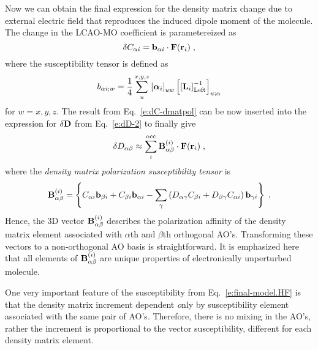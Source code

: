 \documentclass[aip,graphicx]{revtex4-1}
\newcommand{\BM}[1]{\bm{#1}}
\begin{document}
Now we can obtain the final expression for the density matrix change 
due to external electric field that reproduces the 
induced dipole moment of the molecule.
The change in the LCAO\hyp{}MO coefficient is parametereized as
%
\begin{equation} \label{e:dC-dmatpol}
 \delta C_{\alpha i} = {\bf b}_{\alpha i} \cdot {\bf F}({\bf r}_i)  \;,
\end{equation}
%
where the susceptibility tensor is defined as
%
\begin{equation} \label{e:susceptibility-b}
  b_{\alpha i;w} = \frac{1}{4} \sum_u^{x, y, z} \left[ {\BM{\alpha}}_i \right]_{uw}
   \left[ \left[ {\bf L}_i  \right]^{-1}_{\rm Left} \right]_{u;\alpha}  
\end{equation}
%
for $w=x,y,z$. The result from Eq.~\eqref{e:dC-dmatpol} can be now inserted into 
the expression for $\delta {\bf D}$ from Eq.~\eqref{e:dD-2} to finally give
%
\begin{equation}\label{e:final-model.HF}
 \delta D_{\alpha\beta} \approx \sum_i^{\rm occ} {\bf B}^{(i)}_{\alpha\beta} \cdot {\bf F}({\bf r}_i)  \;,
\end{equation}
%
where the \emph{density matrix polarization susceptibility tensor} is
%
\begin{equation}  \label{e:susceptibility-B}
 {\bf B}^{(i)}_{\alpha\beta} = \left\{
%
                               C_{\alpha i} {\bf b}_{\beta i} + C_{\beta i} {\bf b}_{\alpha i}
                               - \sum_\gamma 
                                 \left( 
               D_{\alpha\gamma} C_{\beta i} + D_{\beta\gamma} C_{\alpha i}
                                 \right)
                                           {\bf b}_{\gamma i}
%
\right\}  \;.
\end{equation}
%
Hence, the 3D vector ${\bf B}^{(i)}_{\alpha\beta}$ describes the polarization affinity
of the density matrix element associated with $\alpha$th and $\beta$th orthogonal AO's.
Transforming these vectors to a non\hyp{}orthogonal AO basis is straightforward.
It is emphasized here that all elements of ${\bf B}_{\alpha\beta}^{(i)}$
are unique properties of electronically unperturbed molecule. 

One very important feature of the susceptibility from Eq.~\eqref{e:final-model.HF} is that
the density matrix increment dependent {\emph only} by susceptibility element associated with the same
pair of AO's. Therefore, there is no mixing in the AO's, rather the increment is proportional to the 
vector susceptibility, different for each density matrix element.
\end{document}
